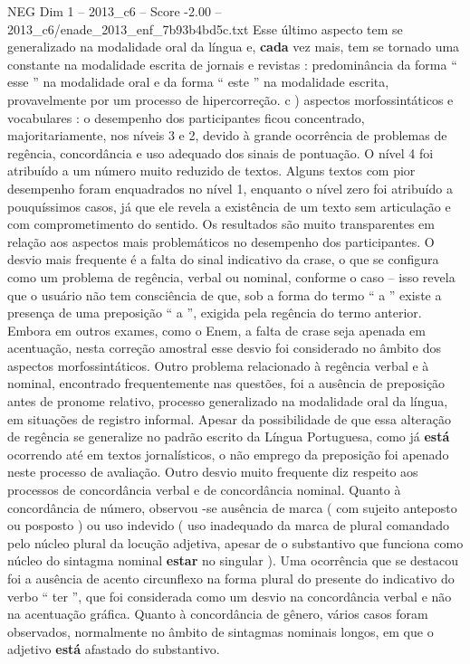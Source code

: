 \begin{textsample}{NEG Dim 1 – 2013\_c6 – Score -2.00 – 2013\_c6/enade\_2013\_enf\_7b93b4bd5c.txt}
Esse último aspecto tem se generalizado na modalidade oral da língua e, \textbf{cada} vez mais, tem se tornado uma constante na modalidade escrita de jornais e revistas : predominância da forma “ esse ” na modalidade oral e da forma “ este ” na modalidade escrita, provavelmente por um processo de hipercorreção. c ) aspectos morfossintáticos e vocabulares : o desempenho dos participantes ficou concentrado, majoritariamente, nos níveis 3 e 2, devido à grande ocorrência de problemas de regência, concordância e uso adequado dos sinais de pontuação.
O nível 4 foi atribuído a um número muito reduzido de textos.
Alguns textos com pior desempenho foram enquadrados no nível 1, enquanto o nível zero foi atribuído a pouquíssimos casos, já que ele revela a existência de um texto sem articulação e com comprometimento do sentido.
Os resultados são muito transparentes em relação aos aspectos mais problemáticos no desempenho dos participantes.
O desvio mais frequente é a falta do sinal indicativo da crase, o que se configura como um problema de regência, verbal ou nominal, conforme o caso – isso revela que o usuário não tem consciência de que, sob a forma do termo “ a ” existe a presença de uma preposição “ a ”, exigida pela regência do termo anterior.
Embora em outros exames, como o Enem, a falta de crase seja apenada em acentuação, nesta correção amostral esse desvio foi considerado no âmbito dos aspectos morfossintáticos.
Outro problema relacionado à regência verbal e à nominal, encontrado frequentemente nas questões, foi a ausência de preposição antes de pronome relativo, processo generalizado na modalidade oral da língua, em situações de registro informal.
Apesar da possibilidade de que essa alteração de regência se generalize no padrão escrito da Língua Portuguesa, como já \textbf{está} ocorrendo até em textos jornalísticos, o não emprego da preposição foi apenado neste processo de avaliação.
Outro desvio muito frequente diz respeito aos processos de concordância verbal e de concordância nominal.
Quanto à concordância de número, observou -se ausência de marca ( com sujeito anteposto ou posposto ) ou uso indevido ( uso inadequado da marca de plural comandado pelo núcleo plural da locução adjetiva, apesar de o substantivo que funciona como núcleo do sintagma nominal \textbf{estar} no singular ).
Uma ocorrência que se destacou foi a ausência de acento circunflexo na forma plural do presente do indicativo do verbo “ ter ”, que foi considerada como um desvio na concordância verbal e não na acentuação gráfica.
Quanto à concordância de gênero, vários casos foram observados, normalmente no âmbito de sintagmas nominais longos, em que o adjetivo \textbf{está} afastado do substantivo.

\end{textsample}
